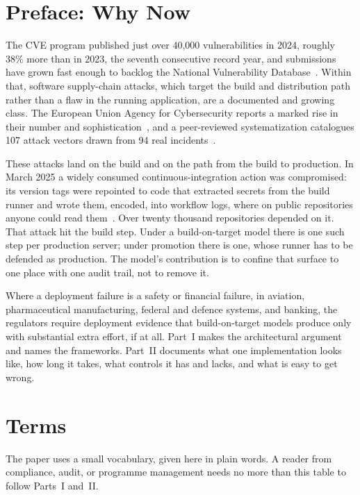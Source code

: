 \documentclass[11pt]{article}
\begin{document}
\section*{Preface: Why Now}

The CVE program published just over 40,000 vulnerabilities in 2024, roughly 38\% more than in 2023, the seventh consecutive record year, and submissions have grown fast enough to backlog the National Vulnerability Database~\cite{CVEStats}. Within that, software supply-chain attacks, which target the build and distribution path rather than a flaw in the running application, are a documented and growing class. The European Union Agency for Cybersecurity reports a marked rise in their number and sophistication~\cite{ENISA}, and a peer-reviewed systematization catalogues 107 attack vectors drawn from 94 real incidents~\cite{Ladisa}.

These attacks land on the build and on the path from the build to production. In March 2025 a widely consumed continuous-integration action was compromised: its version tags were repointed to code that extracted secrets from the build runner and wrote them, encoded, into workflow logs, where on public repositories anyone could read them~\cite{TJActions}. Over twenty thousand repositories depended on it. That attack hit the build step. Under a build-on-target model there is one such step per production server; under promotion there is one, whose runner has to be defended as production. The model's contribution is to confine that surface to one place with one audit trail, not to remove it.

Where a deployment failure is a safety or financial failure, in aviation, pharmaceutical manufacturing, federal and defence systems, and banking, the regulators require deployment evidence that build-on-target models produce only with substantial extra effort, if at all. Part~I makes the architectural argument and names the frameworks. Part~II documents what one implementation looks like, how long it takes, what controls it has and lacks, and what is easy to get wrong.

\section*{Terms}

The paper uses a small vocabulary, given here in plain words. A reader from compliance, audit, or programme management needs no more than this table to follow Parts~I and~II.
\end{document}
